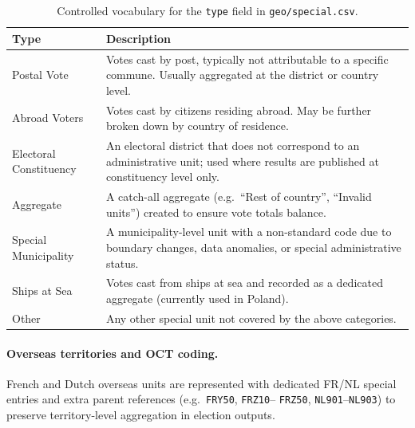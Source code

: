 \begin{table}[h]
\centering
\begin{tabular}{lp{10cm}}
\toprule
\textbf{Type} & \textbf{Description} \\
\midrule
Postal Vote              & Votes cast by post, typically not attributable to
                           a specific commune.  Usually aggregated at the
                           district or country level. \\
Abroad Voters            & Votes cast by citizens residing abroad.  May be
                           further broken down by country of residence. \\
Electoral Constituency   & An electoral district that does not correspond to
                           an administrative unit; used where results are
                           published at constituency level only. \\
Aggregate                & A catch-all aggregate (e.g.\ ``Rest of country'',
                           ``Invalid units'') created to ensure vote totals
                           balance. \\
Special Municipality     & A municipality-level unit with a non-standard
                           code due to boundary changes, data anomalies, or
                           special administrative status. \\
Ships at Sea             & Votes cast from ships at sea and recorded as a
                           dedicated aggregate (currently used in Poland). \\
Other                    & Any other special unit not covered by the above
                           categories. \\
\bottomrule
\end{tabular}
\caption{Controlled vocabulary for the \texttt{type} field in
         \texttt{geo/special.csv}.}
\label{tab:special_types}
\end{table}

\paragraph{Overseas territories and OCT coding.}
French and Dutch overseas units are represented with dedicated FR/NL special
entries and extra parent references (e.g.\ \texttt{FRY50}, \texttt{FRZ10}–
\texttt{FRZ50}, \texttt{NL901}–\texttt{NL903}) to preserve territory-level
aggregation in election outputs.
